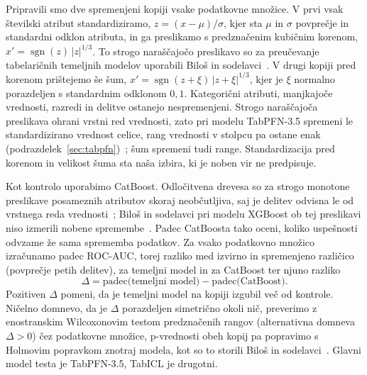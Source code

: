 \documentclass[a4paper,12pt,openright]{book}
\begin{document}
Pripravili smo dve spremenjeni kopiji vsake podatkovne množice. V prvi vsak
številski atribut standardiziramo, $z = (x - \mu)/\sigma$, kjer sta $\mu$ in
$\sigma$ povprečje in standardni odklon atributa, in ga preslikamo s
predznačenim kubičnim korenom, $x' = \operatorname{sgn}(z)\,|z|^{1/3}$. To
strogo naraščajočo preslikavo so za preučevanje tabelaričnih temeljnih modelov
uporabili Biloš in sodelavci~\cite{bilos2026mechanistic}. V drugi kopiji pred
korenom prištejemo še šum, $x' = \operatorname{sgn}(z + \xi)\,|z +
\xi|^{1/3}$, kjer je $\xi$ normalno porazdeljen s standardnim
odklonom $0{,}1$. Kategorični atributi, manjkajoče vrednosti, razredi in
delitve ostanejo nespremenjeni. Strogo naraščajoča preslikava ohrani vrstni red
vrednosti, zato pri modelu TabPFN-3.5 spremeni le standardizirano vrednost
celice, rang vrednosti v stolpcu pa ostane enak
(podrazdelek~\ref{sec:tabpfn})~\cite{jager2026tabpfn35}; šum spremeni tudi
range. Standardizacija pred korenom in velikost šuma sta naša izbira, ki je
noben vir ne predpisuje.

Kot kontrolo uporabimo CatBoost. Odločitvena drevesa so za strogo monotone
preslikave posameznih atributov skoraj neobčutljiva, saj je delitev odvisna le
od vrstnega reda vrednosti~\cite{galili2016splitting}; Biloš in sodelavci pri
modelu XGBoost ob tej preslikavi niso izmerili nobene
spremembe~\cite{bilos2026mechanistic}. Padec CatBoosta tako oceni, koliko
uspešnosti odvzame že sama sprememba podatkov. Za vsako podatkovno množico
izračunamo padec ROC-AUC, torej razliko med izvirno in spremenjeno različico
(povprečje petih delitev), za temeljni model in za CatBoost ter njuno razliko
\[
\Delta = \text{padec(temeljni model)} - \text{padec(CatBoost)}.
\]
Pozitiven $\Delta$ pomeni, da je temeljni model na kopiji izgubil več od
kontrole. Ničelno domnevo, da je $\Delta$ porazdeljen simetrično okoli nič,
preverimo z enostranskim Wilcoxonovim testom predznačenih rangov (alternativna
domneva $\Delta > 0$) čez podatkovne množice, p-vrednosti obeh kopij pa
popravimo s Holmovim popravkom znotraj modela, kot so to storili Biloš in
sodelavci~\cite{bilos2026mechanistic}. Glavni model testa je TabPFN-3.5,
TabICL je drugotni.
\end{document}
